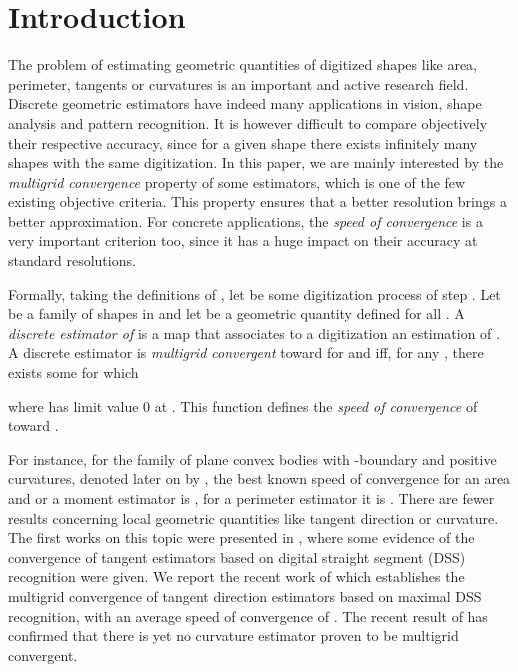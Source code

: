 \documentclass{llncs}
\begin{document}
\section{Introduction}

The problem of estimating geometric quantities of digitized shapes
like area, perimeter, tangents or curvatures is an important and
active research field. Discrete geometric estimators have indeed many
applications in vision, shape analysis and pattern recognition. It is
however difficult to compare objectively their respective accuracy,
since for a given shape there exists infinitely many shapes with the
same digitization. In this paper, we are mainly interested by the {\em
  multigrid convergence} property of some estimators, which is one of
the few existing objective criteria. This property ensures that a
better resolution brings a better approximation. For concrete
applications, the {\em speed of convergence} is a very important
criterion too, since it has a huge impact on their accuracy at
standard resolutions.

Formally, taking the definitions of \cite{Klette04}, let  be
some digitization process of step . Let  be a family of shapes
in  and let  be a geometric quantity defined for all . A {\em discrete estimator of } is a map that associates to
a digitization  an estimation of . A discrete
estimator \DE{\GQ} is {\em multigrid convergent} toward  for
 and  iff, for any , there exists some 
for which

where  has limit value 0 at
. This function defines the {\em speed of convergence} of
 toward .

For instance, for the family of plane convex bodies with
-boundary and positive curvatures, denoted later on by ,
the best known speed of convergence for an area and or a moment
estimator is  \cite{Huxley90,Klette00}, for a
perimeter estimator it is  \cite{Sloboda98}. There are fewer
results concerning local geometric quantities like tangent direction
or curvature. The first works on this topic were presented in
\cite{Coeurjolly02a}, where some evidence of the convergence of tangent
estimators based on digital straight segment (DSS) recognition were
given. We report the recent work of \Cite{IVC06} which establishes the
multigrid convergence of tangent direction estimators based on maximal
DSS recognition, with an average speed of convergence of
. The recent result of
\cite{deVieilleville05a} has confirmed that there is yet no curvature
estimator proven to be multigrid convergent.
\end{document}

